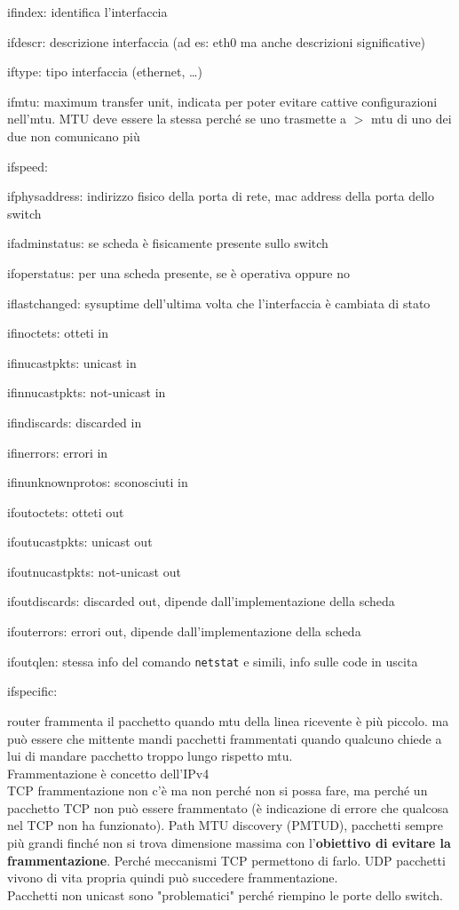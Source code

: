 \documentclass[10pt]{book}
\begin{document}
\begin{list}{}{tutti valori letti dalla scheda di rete}
	\item ifindex: identifica l'interfaccia
	\item ifdescr: descrizione interfaccia (ad es: eth0 ma anche descrizioni significative)
	\item iftype: tipo interfaccia (ethernet, \ldots)
	\item ifmtu: maximum transfer unit, indicata per poter evitare cattive configurazioni nell'mtu. MTU deve essere la stessa perché se uno trasmette a $>$ mtu di uno dei due non comunicano più
	\item ifspeed: 
	\item ifphysaddress: indirizzo fisico della porta di rete, mac address della porta dello switch
	\item ifadminstatus: se scheda è fisicamente presente sullo switch
	\item ifoperstatus: per una scheda presente, se è operativa oppure no
	\item iflastchanged: sysuptime dell'ultima volta che l'interfaccia è cambiata di stato
	\item ifinoctets: otteti in
	\item ifinucastpkts: unicast in
	\item ifinnucastpkts: not-unicast in
	\item ifindiscards: discarded in
	\item ifinerrors: errori in
	\item ifinunknownprotos: sconosciuti in
	\item ifoutoctets: otteti out
	\item ifoutucastpkts: unicast out
	\item ifoutnucastpkts: not-unicast out
	\item ifoutdiscards: discarded out, dipende dall'implementazione della scheda
	\item ifouterrors: errori out, dipende dall'implementazione della scheda
	\item ifoutqlen: stessa info del comando \texttt{netstat} e simili, info sulle code in uscita
	\item ifspecific:
\end{list}
router frammenta il pacchetto quando mtu della linea ricevente è più piccolo. ma può essere che mittente mandi pacchetti frammentati quando qualcuno chiede a lui di mandare pacchetto troppo lungo rispetto mtu.\\
Frammentazione è concetto dell'IPv4\\
TCP frammentazione non c'è ma non perché non si possa fare, ma perché un pacchetto TCP non può essere frammentato (è indicazione di errore che qualcosa nel TCP non ha funzionato). Path MTU discovery (PMTUD), pacchetti sempre più grandi finché non si trova dimensione massima con l'\textbf{obiettivo di evitare la frammentazione}. Perché meccanismi TCP permettono di farlo. UDP pacchetti vivono di vita propria quindi può succedere frammentazione.\\
Pacchetti non unicast sono "problematici" perché riempino le porte dello switch.
\end{document}
